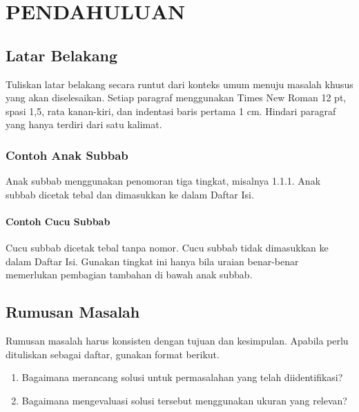 \chapter{PENDAHULUAN}


\section{Latar Belakang}

Tuliskan latar belakang secara runtut dari konteks umum menuju masalah khusus yang akan diselesaikan. Setiap paragraf menggunakan Times New Roman 12 pt, spasi 1,5, rata kanan-kiri, dan indentasi baris pertama 1 cm. Hindari paragraf yang hanya terdiri dari satu kalimat.

\subsection{Contoh Anak Subbab}

Anak subbab menggunakan penomoran tiga tingkat, misalnya 1.1.1. Anak subbab dicetak tebal dan dimasukkan ke dalam Daftar Isi.

\subsubsection*{Contoh Cucu Subbab}

Cucu subbab dicetak tebal tanpa nomor. Cucu subbab tidak dimasukkan ke dalam Daftar Isi. Gunakan tingkat ini hanya bila uraian benar-benar memerlukan pembagian tambahan di bawah anak subbab.

\section{Rumusan Masalah}

Rumusan masalah harus konsisten dengan tujuan dan kesimpulan. Apabila perlu dituliskan sebagai daftar, gunakan format berikut.

\begin{enumerate}
  \item Bagaimana merancang solusi untuk permasalahan yang telah diidentifikasi?
  \item Bagaimana mengevaluasi solusi tersebut menggunakan ukuran yang relevan?
\end{enumerate}

